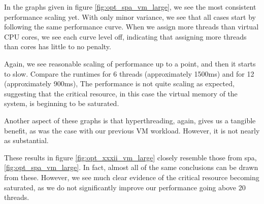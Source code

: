 In the graphs given in figure \ref{fig:opt_spa_vm_large}, we see the most consistent performance scaling yet. With only minor variance, we see that all cases start by following the same performance curve. When we assign more threads than virtual CPU cores, we see each curve level off, indicating that assigning more threads than cores has little to no penalty. 

Again, we see reasonable scaling of performance up to a point, and then it starts to slow. Compare the runtimes for 6 threads (approximately 1500ms) and for 12 (approximately 900ms), The performance is not quite scaling as expected, suggesting that the critical resource, in this case the virtual memory of the system, is beginning to be saturated.

Another aspect of these graphs is that hyperthreading, again, gives us a tangible benefit, as was the case with our previous VM workload. However, it is not nearly as substantial.



These results in figure \ref{fig:opt_xxxii_vm_large} closely resemble those from spa, \ref{fig:opt_spa_vm_large}. In fact, almost all of the same conclusions can be drawn from these. However, we see much clear evidence of the critical resource becoming saturated, as we do not significantly improve our performance going above 20 threads.



